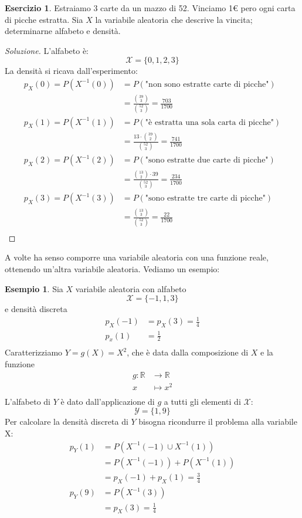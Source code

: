 \documentclass{article}
\theoremstyle{plain}
\theoremstyle{definition}
\newtheorem{esercizio}{Esercizio}[section]
\newtheorem{esempio}{Esempio}[section]
\theoremstyle{remark}
\newenvironment{soluzione}
	{\renewcommand\qedsymbol{$\mathwitch*$}\begin{proof}[Soluzione]}
	{\end{proof}}
\renewcommand{\qedsymbol}{$\mathrightghost$}
\begin{document}
\begin{esercizio}
	Estraiamo 3 carte da un mazzo di 52. Vinciamo 1€ pero ogni carta di picche estratta. Sia $X$ la variabile aleatoria che descrive la vincita; determinarne alfabeto e densità.
	\begin{soluzione}
		L'alfabeto è:
		\begin{equation*}
			\mathcal{X}=\{0,1,2,3\}
		\end{equation*}
		La densità si ricava dall'esperimento:
		\begin{align*}
			p_X(0)=P(X^{-1}(0))&=P(\text{"non sono estratte carte di picche"})\\
			&=\frac{\binom{39}{3}}{\binom{52}{3}}=\frac{703}{1700}\\
			p_X(1)=P(X^{-1}(1))&=P(\text{"è estratta una sola carta di picche"})\\
			&=\frac{13\cdot\binom{39}{2}}{\binom{52}{3}}=\frac{741}{1700}\\
			p_X(2)=P(X^{-1}(2))&=P(\text{"sono estratte due carte di picche"})\\
			&=\frac{\binom{13}{2}\cdot39}{\binom{52}{3}}=\frac{234}{1700}\\
			p_X(3)=P(X^{-1}(3))&=P(\text{"sono estratte tre carte di picche"})\\
			&=\frac{\binom{13}{3}}{\binom{52}{3}}=\frac{22}{1700}\\
		\end{align*}
	\end{soluzione}
\end{esercizio}
A volte ha senso comporre una variabile aleatoria con una funzione reale, ottenendo un'altra variabile aleatoria. Vediamo un esempio:
\begin{esempio}
	Sia $X$ variabile aleatoria con alfabeto
	\begin{equation*}
		\mathcal{X}=\{-1,1,3\}
	\end{equation*}
	e densità discreta
	\begin{align*}
		p_X(-1)&=p_X(3)=\frac{1}{4}\\
		p_x(1)&=\frac{1}{2}\\
	\end{align*}
	Caratterizziamo $Y=g(X)=X^2$, che è data dalla composizione di $X$ e la funzione
	\begin{align*}
		g:\mathds{R}&\to\mathds{R}\\
		x&\mapsto x^2\\
	\end{align*}
	L'alfabeto di $Y$ è dato dall'applicazione di $g$ a tutti gli elementi di $\mathcal{X}$:
	\begin{equation*}
		\mathcal{Y}=\{1,9\}
	\end{equation*}
	Per calcolare la densità discreta di $Y$ bisogna ricondurre il problema alla variabile X:
	\begin{align*}
		p_Y(1)&=P(X^{-1}(-1)\cup X^{-1}(1))\\
		&=P(X^{-1}(-1))+P(X^{-1}(1))\\
		&=p_X(-1)+p_X(1)=\frac{3}{4}\\
		p_Y(9)&=P(X^{-1}(3))\\
		&=p_X(3)=\frac{1}{4}\\
	\end{align*}
\end{esempio}
\end{document}
